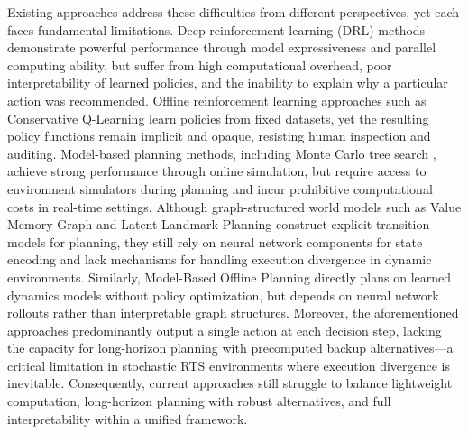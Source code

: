 \documentclass[letterpaper]{article}
\begin{document}
Existing approaches address these difficulties from different perspectives, yet each faces fundamental limitations. Deep reinforcement learning (DRL) methods \citep{vinyals2019alphastar, schulman2017ppo} demonstrate powerful performance through model expressiveness and parallel computing ability, but suffer from high computational overhead, poor interpretability of learned policies, and the inability to explain why a particular action was recommended. Offline reinforcement learning approaches such as Conservative Q-Learning \citep{kumar2020cql} learn policies from fixed datasets, yet the resulting policy functions remain implicit and opaque, resisting human inspection and auditing. Model-based planning methods, including Monte Carlo tree search \citep{silver2016alphago}, achieve strong performance through online simulation, but require access to environment simulators during planning and incur prohibitive computational costs in real-time settings. Although graph-structured world models such as Value Memory Graph \citep{zhu2023vmg} and Latent Landmark Planning \citep{zhang2021l3p} construct explicit transition models for planning, they still rely on neural network components for state encoding and lack mechanisms for handling execution divergence in dynamic environments. Similarly, Model-Based Offline Planning \citep{argenson2021mbop, zhan2022mopp} directly plans on learned dynamics models without policy optimization, but depends on neural network rollouts rather than interpretable graph structures. Moreover, the aforementioned approaches predominantly output a single action at each decision step, lacking the capacity for long-horizon planning with precomputed backup alternatives---a critical limitation in stochastic RTS environments where execution divergence is inevitable. Consequently, current approaches still struggle to balance lightweight computation, long-horizon planning with robust alternatives, and full interpretability within a unified framework.
\end{document}
